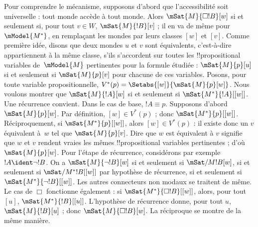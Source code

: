 \documentclass[../../../include/open-logic-section]{subfiles}
\begin{document}
Pour comprendre le mécanisme, supposons d'abord que l'accessibilité
soit universelle : tout monde accède à tout monde. Alors
$\mSat{M}{\Box !B}[w]$ si et seulement si, pour tout $v \in W$,
$\mSat{M}{!B}[v]$ ; il en va de même pour $\mModel{M^*}$, en
remplaçant les mondes par leurs classes $[w]$ et $[v]$. Comme première
idée, disons que deux mondes $u$ et $v$ sont équivalents, c'est-à-dire
appartiennent à la même classe, s'ils s'accordent sur toutes les
!!{propositional variable}s de~$\mModel{M}$ pertinentes pour la formule étudiée :
$\mSat{M}{p}[u]$ si et seulement si $\mSat{M}{p}[v]$ pour chacune de
ces variables. Posons, pour toute variable propositionnelle,
$V^*(p) = \Setabs{[w]}{\mSat{M}{p}[w]}$. Nous voulons montrer que
$\mSat{M}{!A}[w]$ si et seulement si
$\mSat{M^*}{!A}[{[w]}]$. Une récurrence convient. Dans le cas de
base, $!A \equiv p$. Supposons d'abord $\mSat{M}{p}[w]$. Par
définition, $[w] \in V^*(p)$ ; donc $\mSat{M^*}{p}[{[w]}]$.
Réciproquement, si $\mSat{M^*}{p}[{[w]}]$, alors $[w] \in V^*(p)$ :
il existe donc un $v$ équivalent à~$w$ tel que $\mSat{M}{p}[v]$.
Dire que $w$ est équivalent à $v$ signifie que $w$ et $v$ rendent vraies les
mêmes !!{propositional variable}s pertinentes ; d'où
$\mSat{M}{p}[w]$. Pour l'étape de récurrence, considérons par exemple
$!A \ident \lnot !B$. On a $\mSat{M}{\lnot !B}[w]$ si et seulement si
$\mSat/{M}{!B}[w]$, si et seulement si
$\mSat/{M^*}{!B}[{[w]}]$ par hypothèse de récurrence, si et seulement
si $\mSat{M^*}{\lnot !B}[{[w]}]$. Les autres connecteurs non modaux
se traitent de même. Le cas de $\Box$ fonctionne également : si
$\mSat{M^*}{\Box !B}[{[w]}]$, alors, pour tout $[u]$,
$\mSat{M^*}{!B}[{[u]}]$. L'hypothèse de récurrence donne, pour tout
$u$, $\mSat{M}{!B}[u]$ ; donc $\mSat{M}{\Box !B}[w]$. La
réciproque se montre de la même manière.
\end{document}
